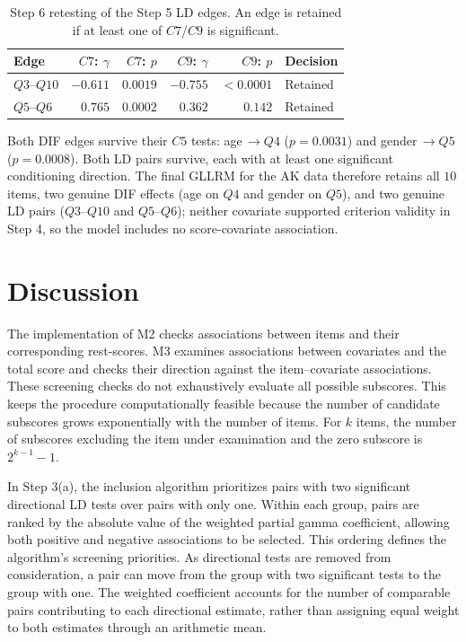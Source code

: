 \documentclass[12pt]{article}
\newcommand{\coauthortodo}[1]{%
  \marginnote{%
    \begin{tcolorbox}[
      width=\marginparwidth,
      colback=yellow!15!white, colframe=orange!70!black,
      colbacktitle=yellow!35!white, coltitle=black,
      title=TODO, fonttitle=\bfseries\scriptsize,
      toptitle=2pt, bottomtitle=2pt,
      fontupper=\scriptsize, boxrule=0.4pt, arc=1mm,
      boxsep=0pt, left=2pt, right=2pt, top=3pt, bottom=3pt,
      before skip=0pt, after skip=0pt
    ]
      \raggedright #1
    \end{tcolorbox}%
  }%
}
\theoremstyle{examplestyle}
\begin{document}
\begin{table}[H]
\centering
\begin{tabular}{@{}lrrrrl@{}}
\toprule
Edge & $C7$: $\gamma$ & $C7$: $p$ & $C9$: $\gamma$ & $C9$: $p$ & Decision \\
\midrule
$Q3$--$Q10$ & $-0.611$ & $0.0019$ & $-0.755$ & $<0.0001$ & Retained \\
$Q5$--$Q6$  & $0.765$  & $0.0002$  & $0.362$  & $0.142$  & Retained \\
\bottomrule
\end{tabular}
\caption{Step 6 retesting of the Step 5 LD edges. An edge is retained if at least one of $C7$/$C9$ is significant.}
\label{tab:ak_step6_ld}
\end{table}
Both DIF edges survive their $C5$ tests: age$\,\to Q4$ ($p=0.0031$) and gender$\,\to Q5$ ($p=0.0008$). Both LD pairs survive, each with at least one significant conditioning direction. The final GLLRM for the AK data therefore retains all $10$ items, two genuine DIF effects (age on $Q4$ and gender on $Q5$), and two genuine LD pairs ($Q3$--$Q10$ and $Q5$--$Q6$); neither covariate supported criterion validity in Step 4, so the model includes no score-covariate association.


\section{Discussion}


The implementation of M2 checks associations between items and their corresponding rest-scores. M3 examines associations between covariates and the total score and checks their direction against the item--covariate associations. These screening checks do not exhaustively evaluate all possible subscores. This keeps the procedure computationally feasible because the number of candidate subscores grows exponentially with the number of items. For $k$ items, the number of subscores excluding the item under examination and the zero subscore is $2^{k-1}-1$.

In Step 3(a), the inclusion algorithm prioritizes pairs with two significant directional LD tests over pairs with only one. Within each group, pairs are ranked by the absolute value of the weighted partial gamma coefficient, allowing both positive and negative associations to be selected. This ordering defines the algorithm's screening priorities. As directional tests are removed from consideration, a pair can move from the group with two significant tests to the group with one. The weighted coefficient accounts for the number of comparable pairs contributing to each directional estimate, rather than assigning equal weight to both estimates through an arithmetic mean.
\end{document}
